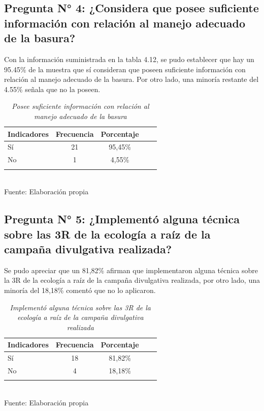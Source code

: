 {\setlength{\parskip}{0cm}
\subsection{Pregunta N° 4: ¿Considera que posee suficiente información con relación al manejo adecuado de la basura?}

Con la información suministrada en la tabla 4.12, se pudo establecer que hay un 95.45\% de la muestra que sí consideran que poseen suficiente información con relación al manejo adecuado de la basura. Por otro lado, una minoría restante del 4.55\% señala que no la poseen.
}

\newpage

\begin{table}[h!]
    \centering
    \captionsetup{singlelinecheck=false, justification=raggedright, labelsep=newline}
    \caption{\textit{Posee suficiente información con relación al manejo adecuado de la basura}}
    \begin{tabular}{lcccc}
        \toprule
        Indicadores & Frecuencia & Porcentaje\\
        \midrule
        Sí & 21 & 95,45\% \\
        No & 1 & 4,55\%\\
        \bottomrule\\
    \end{tabular}
    \\\RaggedRight Fuente: Elaboración propia
    \label{table:cuadro12}
\end{table}

{\setlength{\parskip}{0cm}
\subsection{Pregunta N° 5: ¿Implementó alguna técnica sobre las 3R de la ecología a raíz de la campaña divulgativa realizada?}

Se pudo apreciar que un 81,82\% afirman que implementaron alguna técnica sobre la 3R de la ecología a raíz de la campaña divulgativa realizada, por otro lado, una minoría del 18,18\% comentó que no lo aplicaron.
}

\begin{table}[h!]
    \centering
    \captionsetup{singlelinecheck=false, justification=raggedright, labelsep=newline}
    \caption{\textit{Implementó alguna técnica sobre las 3R de la ecología a raíz de la campaña divulgativa realizada}}
    \begin{tabular}{lcccc}
        \toprule
        Indicadores & Frecuencia & Porcentaje\\
        \midrule
        Sí & 18 & 81,82\% \\
        No & 4 & 18,18\%\\
        \bottomrule\\
    \end{tabular}
    \\\RaggedRight Fuente: Elaboración propia
    \label{table:cuadro13}
\end{table}


